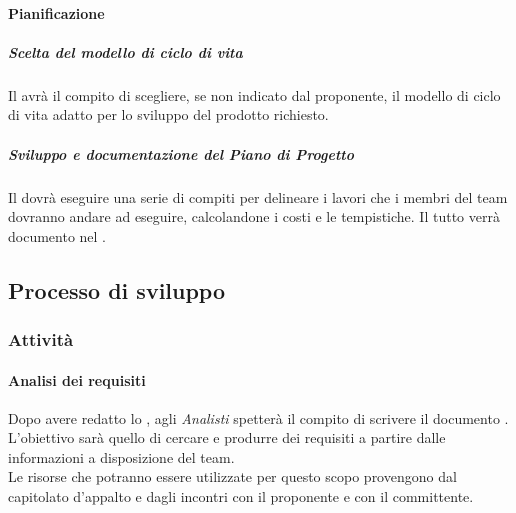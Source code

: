 			\paragraph{Pianificazione}
				\subparagraph{Scelta del modello di ciclo di vita}
Il \roleProjectManager{} avrà il compito di scegliere, se non indicato dal proponente, il modello di ciclo di vita adatto per lo sviluppo del prodotto richiesto.
				\subparagraph{Sviluppo e documentazione del Piano di Progetto}
Il \roleProjectManager{} dovrà eseguire una serie di compiti per delineare i lavori che i membri del team dovranno andare ad eseguire, calcolandone i costi e le tempistiche. Il tutto verrà documento nel \docNameVersionPdP{}.
		
	\subsection{Processo di sviluppo}
		\subsubsection{Attività}
			\paragraph{Analisi dei requisiti}
Dopo avere redatto lo \docNameSdF{}, agli \emph{Analisti} spetterà il compito di scrivere il documento \docNameVersionAdR{}. \\
L'obiettivo sarà quello di cercare e produrre dei requisiti a partire dalle informazioni a disposizione del team. \\
Le risorse che potranno essere utilizzate per questo scopo provengono dal capitolato d'appalto e dagli incontri con il proponente e con il committente. 
